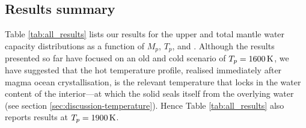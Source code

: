 










\subsection{Results summary}

Table \ref{tab:all_results} lists our results for the upper and total mantle water capacity distributions as a function of $M_p$, $T_p$, and \coreeff. Although the results presented so far have focused on an old and cold scenario of $T_p = 1600\,{\rm K}$, we have suggested that the hot temperature profile, realised immediately after magma ocean crystallisation, is the relevant temperature that locks in the water content of the interior---at which the solid seals itself from the overlying water (see section \ref{sec:discussion-temperature}). Hence Table \ref{tab:all_results} also reports results at $T_p = 1900\,{\rm K}$.

